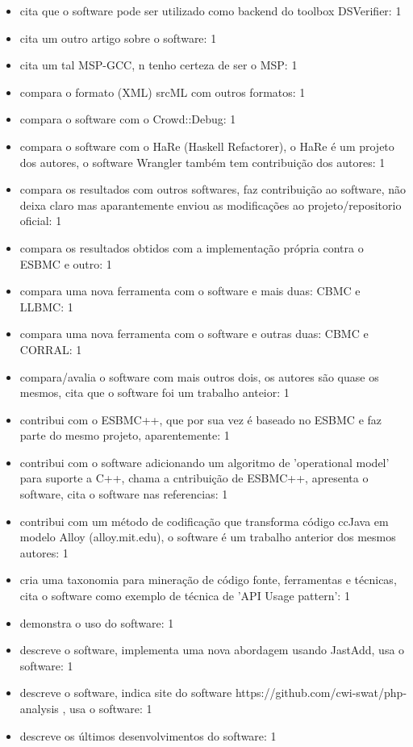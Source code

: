 \begin{itemize}
\item cita que o software pode ser utilizado como backend do toolbox DSVerifier: 1
\item cita um outro artigo sobre o software: 1
\item cita um tal MSP-GCC, n tenho certeza de ser o MSP: 1
\item compara o formato (XML) srcML com outros formatos: 1
\item compara o software com o Crowd::Debug: 1
\item compara o software com o HaRe (Haskell Refactorer), o HaRe é um projeto dos autores, o software Wrangler também tem contribuição dos autores: 1
\item compara os resultados com outros softwares, faz contribuição ao software, não deixa claro mas aparantemente enviou as modificações ao projeto/repositorio oficial: 1
\item compara os resultados obtidos com a implementação própria contra o ESBMC e outro: 1
\item compara uma nova ferramenta com o software e mais duas: CBMC e LLBMC: 1
\item compara uma nova ferramenta com o software e outras duas: CBMC e CORRAL: 1
\item compara/avalia o software com mais outros dois, os autores são quase os mesmos, cita que o software foi um trabalho anteior: 1
\item contribui com o ESBMC++, que por sua vez é baseado no ESBMC e faz parte do mesmo projeto, aparentemente: 1
\item contribui com o software adicionando um algoritmo de 'operational model' para suporte a C++, chama a cntribuição de ESBMC++, apresenta o software, cita o software nas referencias: 1
\item contribui com um método de codificação que transforma código ccJava em modelo Alloy (alloy.mit.edu), o software é um trabalho anterior dos mesmos autores: 1
\item cria uma taxonomia para mineração de código fonte, ferramentas e técnicas, cita o software como exemplo de técnica de 'API Usage pattern': 1
\item demonstra o uso do software: 1
\item descreve o software, implementa uma nova abordagem usando JastAdd, usa o software: 1
\item descreve o software, indica site do software https://github.com/cwi-swat/php-analysis , usa o software: 1
\item descreve os últimos desenvolvimentos do software: 1

\end{itemize}

